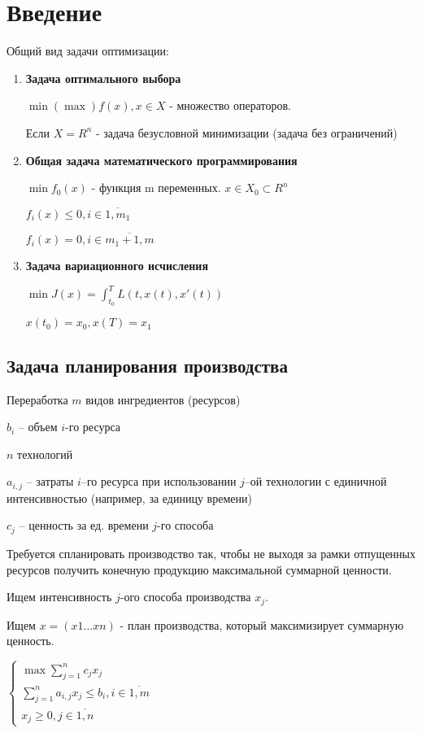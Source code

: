 \documentclass[11pt]{article}
\theoremstyle{break}
\begin{document}
\raggedright
\begin{sloppypar}
  \section*{Введение}
  Общий вид задачи оптимизации:
  \begin{enumerate}
    \item \textbf{Задача оптимального выбора}
    
      $\min (\max) f(x), x \in X$ - множество операторов.

      Если $X = R^n$ - задача безусловной минимизации (задача без ограничений)
    \item \textbf{Общая задача математического программирования}

      $\min f_0(x)$ - функция m переменных. $x \in X_0 \subset R^n$
      
      $f_i(x) \leq 0, i \in \overline{1, m_1}$
      
      $f_i(x) = 0, i \in \overline{m_1 + 1, m}$
    \item \textbf{Задача вариационного исчисления}
    
      $\min J(x) = \int_{t_0}^T L(t, x(t), x'(t))$
      
      $x(t_0) = x_0, x(T) = x_1$
  \end{enumerate}
  \subsection*{Задача планирования производства}
  Переработка $m$ видов ингредиентов (ресурсов)

  $b_i$ – объем $i$-го ресурса
  
  $n$ технологий
  
  $a_{i, j}$ – затраты $i$–го ресурса при использовании $j$–ой технологии с единичной интенсивностью (например, за единицу времени)
  
  $c_j$ – ценность за ед. времени $j$-го способа

  Требуется спланировать производство так, чтобы не выходя за рамки отпущенных ресурсов получить конечную продукцию максимальной суммарной ценности.
  
  Ищем интенсивность $j$-ого способа производства $x_j$.
  
  Ищем $x = (x1 \dots xn)$ - план производства, который максимизирует суммарную ценность.
  
  $\begin{cases}
    \max \sum_{j = 1}^n c_j x_j \\
    \sum_{j = 1}^n a_{i, j} x_j \leq b_i, i \in \overline{1, m} \\
    x_j \geq 0, j \in \overline{1, n}
  \end{cases}$
  

\end{sloppypar}
\end{document}
